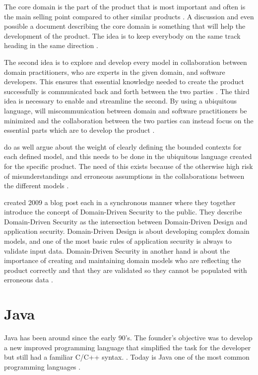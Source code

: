 The core domain is the part of the product that is most important and often is the main selling point compared to other similar products \parencite{millett_2015}. A discussion and even possible a document describing the core domain is something that will help the development of the product. The idea is to keep everybody on the same track heading in the same direction \parencite{EvansEric2004Dd:t}.

The second idea is to explore and develop every model in collaboration between domain practitioners, who are experts in the given domain, and software developers. This ensures that essential knowledge needed to create the product successfully is communicated back and forth between the two parties \parencite{millett_2015}. The third idea is necessary to enable and streamline the second. By using a ubiquitous language, will miscommunication between domain and software practitioners be minimized and the collaboration between the two parties can instead focus on the essential parts which are to develop the product \parencite{evans_2015}.

\textcite{evans_2015} do as well argue about the weight of clearly defining the bounded contexts for each defined model, and this needs to be done in the ubiquitous language created for the specific product. The need of this exists because of the otherwise high risk of misunderstandings and erroneous assumptions in the collaborations between the different models \parencite{millett_2015}.

\textcite{Wilander2009, Johnsson2009} created 2009 a blog post each in a synchronous manner where they together introduce the concept of Domain-Driven Security to the public. They describe Domain-Driven Security as the intersection between Domain-Driven Design and application security. Domain-Driven Design is about developing complex domain models, and one of the most basic rules of application security is always to validate input data. Domain-Driven Security in another hand is about the importance of creating and maintaining domain models who are reflecting the product correctly and that they are validated so they cannot be populated with erroneous data \parencite{Wilander2009, Johnsson2009, Arnor2016, Stendahl2016}.



\section{Java}
\label{JavaInstrumentation}
Java has been around since the early 90's. The founder's objective was to develop a new improved programming language that simplified the task for the developer but still had a familiar C/C++ syntax. \parencite{OracleVoice}. Today is Java one of the most common programming languages \parencite{octoverse}.

